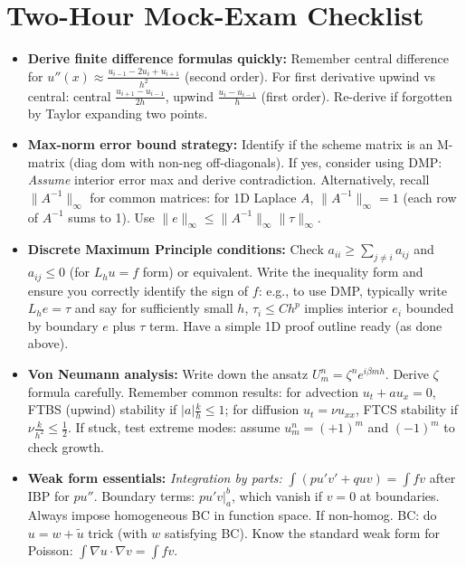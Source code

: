 \documentclass[a4paper,11pt]{article}
\begin{document}
\section{Two-Hour Mock-Exam Checklist}

\begin{itemize}[leftmargin=*]
    \item \textbf{Derive finite difference formulas quickly:} Remember central difference for $u''(x) \approx \frac{u_{i-1}-2u_i+u_{i+1}}{h^2}$ (second order). For first derivative upwind vs central: central $\frac{u_{i+1}-u_{i-1}}{2h}$, upwind $\frac{u_i - u_{i-1}}{h}$ (first order). Re-derive if forgotten by Taylor expanding two points.

    \item \textbf{Max-norm error bound strategy:} Identify if the scheme matrix is an M-matrix (diag dom with non-neg off-diagonals). If yes, consider using DMP: \textit{Assume} interior error max and derive contradiction. Alternatively, recall $\|A^{-1}\|_{∞}$ for common matrices: for 1D Laplace $A$, $\|A^{-1}\|_{∞} = 1$ (each row of $A^{-1}$ sums to 1). Use $\|e\|_{∞} \le \|A^{-1}\|_{∞}\|\tau\|_{∞}$.

    \item \textbf{Discrete Maximum Principle conditions:} Check $a_{ii} \ge \sum_{j\ne i}a_{ij}$ and $a_{ij}\le 0$ (for $L_h u = f$ form) or equivalent. Write the inequality form and ensure you correctly identify the sign of $f$: e.g., to use DMP, typically write $L_h e = \tau$ and say for sufficiently small $h$, $\tau_i \le C h^p$ implies interior $e_i$ bounded by boundary $e$ plus $\tau$ term. Have a simple 1D proof outline ready (as done above).

    \item \textbf{Von Neumann analysis:} Write down the ansatz $U^n_m = \zeta^n e^{i\beta m h}$. Derive $\zeta$ formula carefully. Remember common results: for advection $u_t + a u_x=0$, FTBS (upwind) stability if $|a|\frac{k}{h} \le 1$; for diffusion $u_t=\nu u_{xx}$, FTCS stability if $\nu \frac{k}{h^2}\le \frac{1}{2}$. If stuck, test extreme modes: assume $u^n_m = (+1)^m$ and $(-1)^m$ to check growth.

    \item \textbf{Weak form essentials:} \textit{Integration by parts:} $\int (p u' v' + q u v) = \int f v$ after IBP for $p u''$. Boundary terms: $p u' v|_{a}^{b}$, which vanish if $v=0$ at boundaries. Always impose homogeneous BC in function space. If non-homog. BC: do $u = w + \tilde{u}$ trick (with $w$ satisfying BC). Know the standard weak form for Poisson: $\int \nabla u \cdot \nabla v = \int f v$.


\end{itemize}
\end{document}
